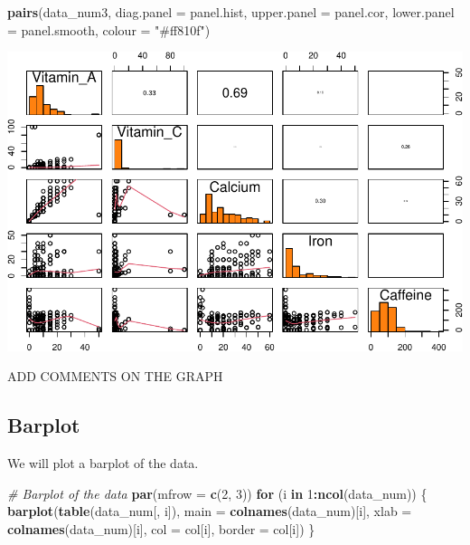 \documentclass[
]{article}
\newenvironment{Shaded}{\begin{snugshade}}{\end{snugshade}}
\newcommand{\AttributeTok}[1]{\textcolor[rgb]{0.13,0.29,0.53}{#1}}
\newcommand{\CommentTok}[1]{\textcolor[rgb]{0.56,0.35,0.01}{\textit{#1}}}
\newcommand{\ControlFlowTok}[1]{\textcolor[rgb]{0.13,0.29,0.53}{\textbf{#1}}}
\newcommand{\DecValTok}[1]{\textcolor[rgb]{0.00,0.00,0.81}{#1}}
\newcommand{\FunctionTok}[1]{\textcolor[rgb]{0.13,0.29,0.53}{\textbf{#1}}}
\newcommand{\NormalTok}[1]{#1}
\newcommand{\SpecialCharTok}[1]{\textcolor[rgb]{0.81,0.36,0.00}{\textbf{#1}}}
\newcommand{\StringTok}[1]{\textcolor[rgb]{0.31,0.60,0.02}{#1}}
\begin{document}
\begin{Shaded}
\begin{Highlighting}[]
\FunctionTok{pairs}\NormalTok{(data\_num3, }
      \AttributeTok{diag.panel =}\NormalTok{ panel.hist,}
      \AttributeTok{upper.panel =}\NormalTok{ panel.cor,}
      \AttributeTok{lower.panel =}\NormalTok{ panel.smooth,}
      \AttributeTok{colour =} \StringTok{"\#ff810f"}\NormalTok{)}
\end{Highlighting}
\end{Shaded}

\begin{center}\includegraphics{Statistical_Learning_Final_Report_files/figure-latex/pairplot-3} \end{center}

ADD COMMENTS ON THE GRAPH

\hypertarget{barplot}{%
\subsection{Barplot}\label{barplot}}

We will plot a barplot of the data.

\begin{Shaded}
\begin{Highlighting}[]
\CommentTok{\# Barplot of the data}
\FunctionTok{par}\NormalTok{(}\AttributeTok{mfrow =} \FunctionTok{c}\NormalTok{(}\DecValTok{2}\NormalTok{, }\DecValTok{3}\NormalTok{))}
\ControlFlowTok{for}\NormalTok{ (i }\ControlFlowTok{in} \DecValTok{1}\SpecialCharTok{:}\FunctionTok{ncol}\NormalTok{(data\_num)) \{}
  \FunctionTok{barplot}\NormalTok{(}\FunctionTok{table}\NormalTok{(data\_num[, i]), }\AttributeTok{main =} \FunctionTok{colnames}\NormalTok{(data\_num)[i],}
          \AttributeTok{xlab =} \FunctionTok{colnames}\NormalTok{(data\_num)[i], }\AttributeTok{col =}\NormalTok{ col[i], }\AttributeTok{border =}\NormalTok{ col[i])}
\NormalTok{\}}
\end{Highlighting}
\end{Shaded}
\end{document}
